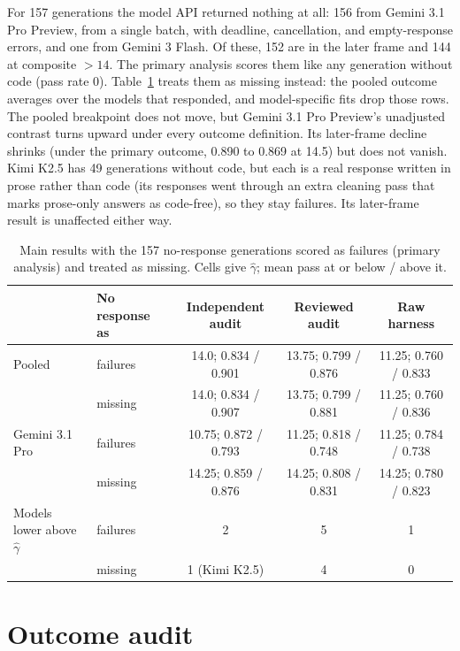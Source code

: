 \documentclass{article}
\begin{document}
For 157 generations the model API returned nothing at all: 156 from Gemini 3.1 Pro Preview, from a single batch, with deadline, cancellation, and empty-response errors, and one from Gemini 3 Flash. Of these, 152 are in the later frame and 144 at composite $>14$. The primary analysis scores them like any generation without code (pass rate 0). Table~\ref{tab:no-response} treats them as missing instead: the pooled outcome averages over the models that responded, and model-specific fits drop those rows. The pooled breakpoint does not move, but Gemini 3.1 Pro Preview's unadjusted contrast turns upward under every outcome definition. Its later-frame decline shrinks (under the primary outcome, 0.890 to 0.869 at 14.5) but does not vanish. Kimi K2.5 has 49 generations without code, but each is a real response written in prose rather than code (its responses went through an extra cleaning pass that marks prose-only answers as code-free), so they stay failures. Its later-frame result is unaffected either way.

\begin{table}[h]
\centering
\caption{Main results with the 157 no-response generations scored as failures (primary analysis) and treated as missing. Cells give $\hat{\gamma}$; mean pass at or below / above it.}
\label{tab:no-response}
\small
\setlength{\tabcolsep}{4pt}
\begin{tabular}{@{}llccc@{}}
\toprule
 & No response as & Independent audit & Reviewed audit & Raw harness \\
\midrule
Pooled & failures & 14.0; 0.834 / 0.901 & 13.75; 0.799 / 0.876 & 11.25; 0.760 / 0.833 \\
 & missing & 14.0; 0.834 / 0.907 & 13.75; 0.799 / 0.881 & 11.25; 0.760 / 0.836 \\
Gemini 3.1 Pro & failures & 10.75; 0.872 / 0.793 & 11.25; 0.818 / 0.748 & 11.25; 0.784 / 0.738 \\
 & missing & 14.25; 0.859 / 0.876 & 14.25; 0.808 / 0.831 & 14.25; 0.780 / 0.823 \\
\midrule
Models lower above $\hat{\gamma}$ & failures & 2 & 5 & 1 \\
 & missing & 1 (Kimi K2.5) & 4 & 0 \\
\bottomrule
\end{tabular}
\end{table}

\clearpage
\section{Outcome audit}
\label{app:outcome-audit}
\end{document}
